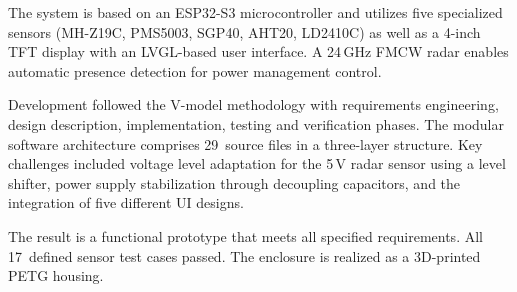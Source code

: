 The system is based on an ESP32-S3 microcontroller and utilizes five specialized sensors (MH-Z19C, PMS5003, SGP40, AHT20, LD2410C) as well as a 4-inch TFT display with an LVGL-based user interface. A 24\,GHz FMCW radar enables automatic presence detection for power management control.

Development followed the V-model methodology with requirements engineering, design description, implementation, testing and verification phases. The modular software architecture comprises 29~source files in a three-layer structure. Key challenges included voltage level adaptation for the 5\,V radar sensor using a level shifter, power supply stabilization through decoupling capacitors, and the integration of five different UI designs.

The result is a functional prototype that meets all specified requirements. All 17~defined sensor test cases passed. The enclosure is realized as a 3D-printed PETG housing.

\clearpage
